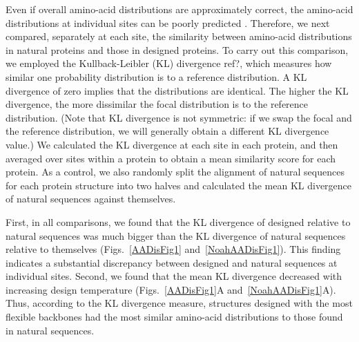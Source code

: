 \documentclass[12pt]{article}
\begin{document}
Even if overall amino-acid distributions are approximately correct, the amino-acid distributions at individual sites can be poorly predicted \cite{Ramsey2011}. Therefore, we next compared, separately at each site, the similarity between amino-acid distributions in natural proteins and those in designed proteins. To carry out this comparison, we employed the Kullback-Leibler (KL) divergence {\color{red}ref?}, which measures how similar one probability distribution is to a reference distribution. A KL divergence of zero implies that the distributions are identical. The higher the KL divergence, the more dissimilar the focal distribution is to the reference distribution. (Note that KL divergence is not symmetric: if we swap the focal and the reference distribution, we will generally obtain a different KL divergence value.) We calculated the KL divergence at each site in each protein, and then averaged over sites within a protein to obtain a mean similarity score for each protein. As a control, we also randomly split the alignment of natural sequences for each protein structure into two halves and calculated the mean KL divergence of natural sequences against themselves.

First, in all comparisons, we found that the KL divergence of designed relative to natural sequences was much bigger than the KL divergence of natural sequences relative to themselves (Figs.~\ref{AADisFig1} and~\ref{NoahAADisFig1}). This finding indicates a substantial discrepancy between designed and natural sequences at individual sites. Second, we found that the mean KL divergence decreased with increasing design temperature (Figs.~\ref{AADisFig1}A and~\ref{NoahAADisFig1}A). Thus, according to the KL divergence measure, structures designed with the most flexible backbones had the most similar amino-acid distributions to those found in natural sequences.
\end{document}
